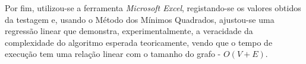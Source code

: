 \documentclass[12pt]{article}
\begin{document}
Por fim, utilizou-se a ferramenta \emph{Microsoft Excel}, registando-se os valores obtidos da testagem e, usando o Método dos Mínimos Quadrados, ajustou-se uma regressão linear que demonstra, experimentalmente, a veracidade da complexidade do algoritmo esperada teoricamente, vendo que o tempo de execução tem uma relação linear com o tamanho do grafo - $O(V+E)$.
\end{document}
